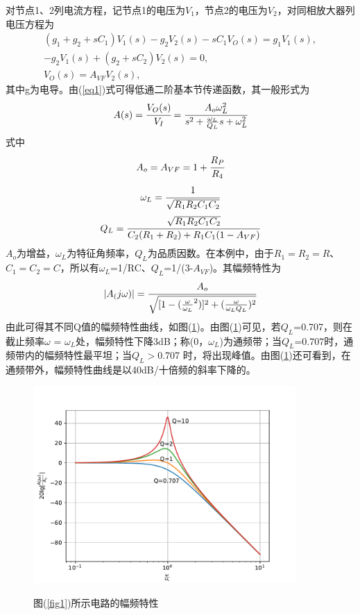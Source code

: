 \documentclass[a4paper]{article}
\begin{document}
对节点1、2列电流方程，记节点1的电压为$V_1$，节点2的电压为$V_2$，对同相放大器列电压方程为
\begin{equation}
\begin{array}{c}
(g_1+g_2+sC_1)V_1(s) - g_2V_2(s) - sC_1V_O(s) = g_1V_1(s), \\
-g_2V_1(s) + (g_2+sC_2)V_2(s) = 0, \\
V_O(s) = A_{VF}V_2(s),
\end{array}\label{eq1}
\end{equation}
其中g为电导。由(\ref{eq1})式可得低通二阶基本节传递函数，其一般形式为
\begin{equation}
A(s) = \cfrac{V_O(s)}{V_I} = \cfrac{A_o\omega_L^2}{s^2+\frac{\omega_L}{Q_L}s+\omega_L^2}\label{eq2}
\end{equation}
式中
$$A_o = A_{VF} = 1+\cfrac{R_P}{R_4}$$
$$\omega_L = \cfrac{1}{\sqrt{R_1R_2C_1C_2}}$$
$$Q_L = \cfrac{\sqrt{R_1R_2C_1C_2}}{C_2(R_1+R_2)+R_1C_1(1-A_{VF})}$$
$A_o$为增益，$\omega_L$为特征角频率，$Q_L$为品质因数。在本例中，由于$R_1=R_2=R$、$C_1=C_2=C$，所以有$\omega_L$=1/RC、$Q_L$=1/(3-$A_{VF}$)。其幅频特性为
\begin{equation}
|A_(j\omega)| = \cfrac{A_o}{\sqrt{[1-(\frac{\omega}{\omega_L}^2)]^2 + (\frac{\omega}{\omega_LQ_L})^2}}\label{eq3}
\end{equation}
由此可得其不同Q值的幅频特性曲线，如图(\ref{fig2})。由图(\ref{fig2})可见，若$Q_L$=0.707，则在截止频率$\omega$ = $\omega_L$处，幅频特性下降3dB；称(0，$\omega_L$)为通频带；当$Q_L$=0.707时，通频带内的幅频特性最平坦；当$Q_L>$0.707 时，将出现峰值。由图(\ref{fig2})还可看到，在通频带外，幅频特性曲线是以40dB/十倍频的斜率下降的。

\begin{figure}[!h]
\centering
\includegraphics[width=10cm]{fig/fig2.pdf}\\
\caption{图(\ref{fig1})所示电路的幅频特性}\label{fig2}
\end{figure}
\end{document}
